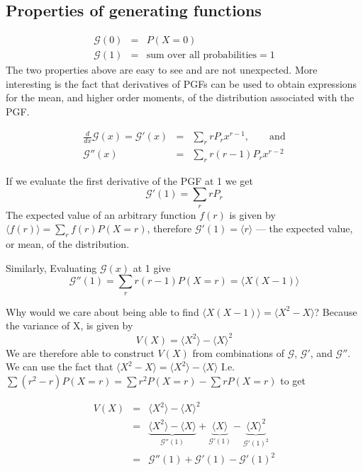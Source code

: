 \documentclass{article}
\newcommand{\calG}{\mathcal{G}}
\begin{document}
\subsection*{Properties of generating functions}
\begin{eqnarray*}
	\calG(0)&=&P(X=0)\\
	\calG(1)&=&\text{sum over all probabilities}=1
\end{eqnarray*}
The two properties above are easy to see and are not unexpected. More interesting is the fact that derivatives of PGFs can be used to obtain expressions for the mean, and higher order moments, of the distribution associated with the PGF.

\begin{eqnarray*}
	\frac{d}{dx}\calG(x)=\calG'(x)&=&\sum_r rP_r x^{r-1},\qquad\text{and}\\
	\calG''(x)&=&\sum_r r(r-1)P_rx^{r-2}
\end{eqnarray*}

If we evaluate the first derivative of the PGF at 1 we get
$$\calG'(1) = \sum_r rP_r$$
The expected value of an arbitrary function $f(r)$ is given by $\langle f(r)\rangle = \sum_r f(r) P(X=r)$, therefore $\calG'(1) = \langle r\rangle$ --- the expected value, or mean, of the distribution.

Similarly,  Evaluating $\calG(x)$ at 1 give 
$$\calG''(1) = \sum_r r(r-1)P(X=r) = \langle X(X-1)\rangle$$

Why would we care about being able to find $\langle X(X-1)\rangle = \langle X^2 -X\rangle$? Because the variance of X, is given by 
$$ V(X) = \langle X^2\rangle -\langle X\rangle^2$$ We are therefore able to construct $V(X)$ from combinations of $\calG$, $\calG'$, and $\calG''$.
We can use the fact that $\langle X^2 -X\rangle =\langle X^2\rangle-\langle X\rangle$ I.e. $\sum(r^2-r)P(X=r)=\sum r^2P(X=r)-\sum rP(X=r)$ to get

\begin{eqnarray}
V(X)&=&\langle X^2\rangle - \langle X\rangle^2\\
&=&\underbrace{\langle X^2\rangle -  \langle X \rangle}_{\calG''(1)} + \underbrace{\langle X\rangle}_{\calG'(1)} - \underbrace{\langle X \rangle^2}_{\calG'(1)^2}\\
&=& \calG''(1) +\calG'(1)-\calG'(1)^2 \label{eq:binvar}
\end{eqnarray}

\end{document}

